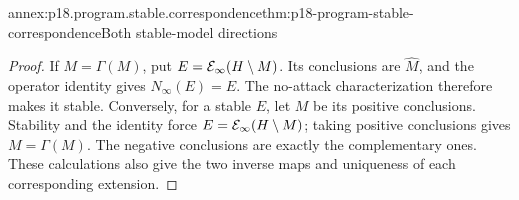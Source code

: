 \begin{annexitem}{annex:p18.program.stable.correspondence}{thm:p18-program-stable-correspondence}{Both stable-model directions}
\begin{proof}
If \(M=\Gamma(M)\), put
\(E={\cal E}_\infty(H\setminus M)\).
Its conclusions are \(\widehat M\), and the operator
identity gives \(N_\infty(E)=E\). The no-attack
characterization therefore makes it stable.
Conversely, for a stable \(E\), let \(M\) be its
positive conclusions. Stability and the identity
force \(E={\cal E}_\infty(H\setminus M)\); taking
positive conclusions gives \(M=\Gamma(M)\).
The negative conclusions are exactly the complementary
ones. These calculations also give the two inverse
maps and uniqueness of each corresponding extension.
\end{proof}
\end{annexitem}

